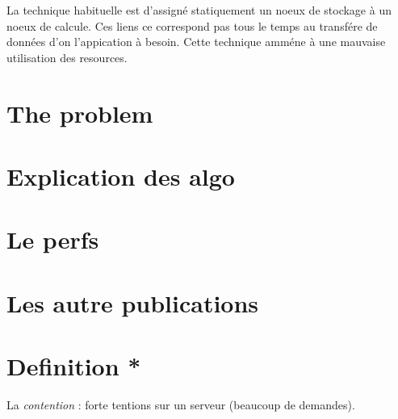 \documentclass[10pt, a4paper]{article}
\begin{document}
La technique habituelle est d'assigné statiquement un noeux de stockage à un noeux de calcule.
Ces liens ce correspond pas tous le temps au transfére de données d'on l'appication à besoin.
Cette technique amméne à une mauvaise utilisation des resources.


\section{The problem}

\section{Explication des algo}


\section{Le perfs}


\section{Les autre publications}


\section{Definition *}

La \emph{contention} : forte tentions sur un serveur (beaucoup de demandes).
\end{document}
